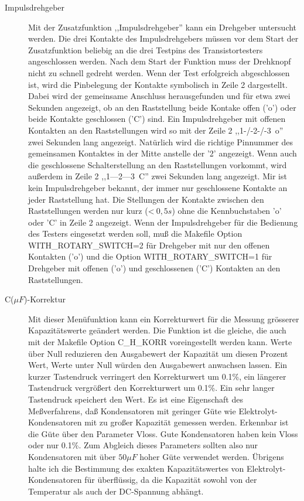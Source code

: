 \begin{description}
 \item[Impulsdrehgeber]
Mit der Zusatzfunktion ,,Impulsdrehgeber'' kann ein Drehgeber untersucht werden.
Die drei Kontakte des Impulsdrehgebers müssen vor dem Start der Zusatzfunktion beliebig an die drei Testpins
 des Transistortesters angeschlossen werden.
Nach dem Start der Funktion muss der Drehknopf nicht zu schnell gedreht werden.
Wenn der Test erfolgreich abgeschlossen ist, wird die Pinbelegung der Kontakte symbolisch in Zeile 2 dargestellt.
Dabei wird der gemeinsame Anschluss herausgefunden und für etwa zwei Sekunden angezeigt,
ob an den Raststellung beide Kontake offen ('o') oder beide Kontakte geschlossen ('C') sind.
Ein Impulsdrehgeber mit offenen Kontakten an den Raststellungen wird so mit der Zeile 2 ,,1-/-2-/-3~o'' zwei Sekunden lang angezeigt.
Natürlich wird die richtige Pinnummer des gemeinsamen Kontaktes in der Mitte anstelle der '2' angezeigt.
Wenn auch die geschlossene Schalterstellung an den Raststellungen vorkommt,
wird außerdem in Zeile 2 ,,1---2---3~C'' zwei Sekunden lang angezeigt.
Mir ist kein Impulsdrehgeber bekannt, der immer nur geschlossene Kontakte an jeder Raststellung hat.
Die Stellungen der Kontakte zwischen den Raststellungen werden nur kurz (\textless\(~0,5s\)) ohne die Kennbuchstaben 'o' oder 'C' 
in Zeile 2 angezeigt.
Wenn der Impulsdrehgeber für die Bedienung des Testers eingesetzt werden soll, muß die Makefile Option WITH\_ROTARY\_SWITCH=2
für Drehgeber mit nur den offenen Kontakten ('o') und die Option WITH\_ROTARY\_SWITCH=1 für Drehgeber mit
offenen ('o') und geschlossenen ('C') Kontakten an den Raststellungen.\\

\item[C(\(\mu F\))-Korrektur]
Mit dieser Menüfunktion kann ein Korrekturwert für die Messung grösserer Kapazitätswerte geändert werden.
Die Funktion ist die gleiche, die auch mit der Makefile Option C\_H\_KORR voreingestellt werden kann.
Werte über Null reduzieren den Ausgabewert der Kapazität um diesen Prozent Wert, Werte unter Null würden den Ausgabewert
anwachsen lassen. Ein kurzer Tastendruck verringert den Korrekturwert um 0.1\%, ein längerer Tastendruck vergrößert
den Korrekturwert um 0.1\%. Ein sehr langer Tastendruck speichert den Wert.  Es ist eine Eigenschaft des
Meßverfahrens, daß Kondensatoren mit geringer Güte wie Elektrolyt-Kondensatoren mit zu großer Kapazität gemessen werden.
Erkennbar ist die Güte über den Parameter Vloss. Gute Kondensatoren haben kein Vloss oder nur 0.1\%.
Zum Abgleich dieses Parameters sollten also nur Kondensatoren mit über \(50\mu F\) hoher Güte verwendet werden.
Übrigens halte ich die Bestimmung des exakten Kapazitätswertes von Elektrolyt-Kondensatoren für überflüssig,
da die Kapazität sowohl von der Temperatur als auch der DC-Spannung abhängt.


\end{description}
